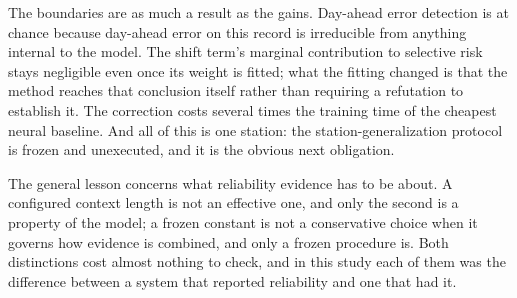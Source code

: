 The boundaries are as much a result as the gains. Day-ahead error detection is at chance because day-ahead error on this record is irreducible from anything internal to the model. The shift term's marginal contribution to selective risk stays negligible even once its weight is fitted; what the fitting changed is that the method reaches that conclusion itself rather than requiring a refutation to establish it. The correction costs several times the training time of the cheapest neural baseline. And all of this is one station: the station-generalization protocol is frozen and unexecuted, and it is the obvious next obligation.

The general lesson concerns what reliability evidence has to be about. A configured context length is not an effective one, and only the second is a property of the model; a frozen constant is not a conservative choice when it governs how evidence is combined, and only a frozen procedure is. Both distinctions cost almost nothing to check, and in this study each of them was the difference between a system that reported reliability and one that had it.
